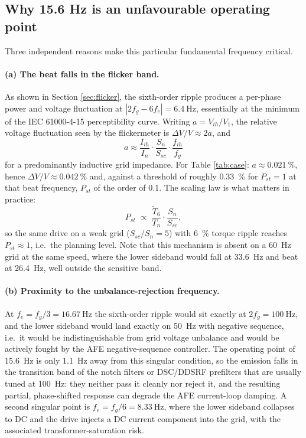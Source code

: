 \documentclass[11pt,a4paper]{article}
\begin{document}
\subsection{Why 15.6 Hz is an unfavourable operating point}

Three independent reasons make this particular fundamental frequency critical.

\paragraph{(a) The beat falls in the flicker band.} As shown in Section
\ref{sec:flicker}, the sixth-order ripple produces a per-phase power and voltage
fluctuation at $|2f_{g}-6f_{e}|=\SI{6.4}{\hertz}$, essentially at the minimum of
the IEC 61000-4-15 perceptibility curve. Writing $a=V_{ih}/V_{1}$, the relative
voltage fluctuation seen by the flickermeter is $\Delta V/V \approx 2a$, and
\begin{equation}
a \approx \frac{I_{ih}}{I_{n}}\cdot\frac{S_{n}}{S_{sc}}\cdot\frac{f_{ih}}{f_{g}}
\end{equation}
for a predominantly inductive grid impedance. For Table \ref{tab:case}:
$a\approx\SI{0.021}{\percent}$, hence $\Delta V/V\approx\SI{0.042}{\percent}$ and,
against a threshold of roughly \SI{0.33}{\percent} for $P_{st}=1$ at that beat
frequency, $P_{st}$ of the order of \num{0.1}. The scaling law is what matters
in practice:
\begin{equation}
P_{st}\;\propto\;\frac{\tilde{T}_{6}}{T_{n}}\cdot\frac{S_{n}}{S_{sc}} ,
\end{equation}
so the same drive on a weak grid ($S_{sc}/S_{n}=5$) with \SI{6}{\percent} torque
ripple reaches $P_{st}\approx1$, i.e.\ the planning level. Note that this
mechanism is absent on a \SI{60}{\hertz} grid at the same speed, where the
lower sideband would fall at \SI{33.6}{\hertz} and beat at \SI{26.4}{\hertz},
well outside the sensitive band.

\paragraph{(b) Proximity to the unbalance-rejection frequency.} At
$f_{e}=f_{g}/3=\SI{16.67}{\hertz}$ the sixth-order ripple would sit exactly at
$2f_{g}=\SI{100}{\hertz}$, and the lower sideband would land exactly on
\SI{50}{\hertz} with negative sequence, i.e.\ it would be indistinguishable from
grid voltage unbalance and would be actively fought by the AFE negative-sequence
controller. The operating point of \SI{15.6}{\hertz} is only \SI{1.1}{\hertz}
away from this singular condition, so the emission falls in the transition band
of the notch filters or DSC/DDSRF prefilters that are usually tuned at
\SI{100}{\hertz}: they neither pass it cleanly nor reject it, and the resulting
partial, phase-shifted response can degrade the AFE current-loop damping. A
second singular point is $f_{e}=f_{g}/6=\SI{8.33}{\hertz}$, where the lower
sideband collapses to DC and the drive injects a DC current component into the
grid, with the associated transformer-saturation risk.
\end{document}
